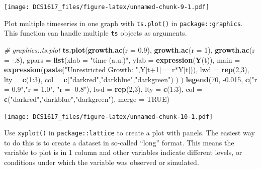 \documentclass[]{book}
\newenvironment{Shaded}{\begin{snugshade}}{\end{snugshade}}
\newcommand{\KeywordTok}[1]{\textcolor[rgb]{0.13,0.29,0.53}{\textbf{{#1}}}}
\newcommand{\DataTypeTok}[1]{\textcolor[rgb]{0.13,0.29,0.53}{{#1}}}
\newcommand{\DecValTok}[1]{\textcolor[rgb]{0.00,0.00,0.81}{{#1}}}
\newcommand{\FloatTok}[1]{\textcolor[rgb]{0.00,0.00,0.81}{{#1}}}
\newcommand{\StringTok}[1]{\textcolor[rgb]{0.31,0.60,0.02}{{#1}}}
\newcommand{\CommentTok}[1]{\textcolor[rgb]{0.56,0.35,0.01}{\textit{{#1}}}}
\newcommand{\OtherTok}[1]{\textcolor[rgb]{0.56,0.35,0.01}{{#1}}}
\newcommand{\NormalTok}[1]{{#1}}
\begin{document}
\texttt{[image: DCS1617\_files/figure-latex/unnamed-chunk-9-1.pdf]}

Plot multiple timeseries in one graph with \texttt{ts.plot()} in
\texttt{package::graphics}. This function can handle multiple
\texttt{ts} objects as arguments.

\begin{Shaded}
\begin{Highlighting}[]
\CommentTok{# graphics::ts.plot}
\KeywordTok{ts.plot}\NormalTok{(}\KeywordTok{growth.ac}\NormalTok{(}\DataTypeTok{r =} \FloatTok{0.9}\NormalTok{), }
        \KeywordTok{growth.ac}\NormalTok{(}\DataTypeTok{r =} \DecValTok{1}\NormalTok{), }
        \KeywordTok{growth.ac}\NormalTok{(}\DataTypeTok{r =} \NormalTok{-.}\DecValTok{8}\NormalTok{), }
        \DataTypeTok{gpars =} \KeywordTok{list}\NormalTok{(}\DataTypeTok{xlab =} \StringTok{"time (a.u.)"}\NormalTok{,}
                     \DataTypeTok{ylab =} \KeywordTok{expression}\NormalTok{(}\KeywordTok{Y}\NormalTok{(t)),}
                     \DataTypeTok{main =} \KeywordTok{expression}\NormalTok{(}\KeywordTok{paste}\NormalTok{(}\StringTok{"Unrestricted Growth: "}\NormalTok{,Y[t}\DecValTok{+1}\NormalTok{]==r*Y[t])),}
                     \DataTypeTok{lwd =} \KeywordTok{rep}\NormalTok{(}\DecValTok{2}\NormalTok{,}\DecValTok{3}\NormalTok{),}
                     \DataTypeTok{lty =} \KeywordTok{c}\NormalTok{(}\DecValTok{1}\NormalTok{:}\DecValTok{3}\NormalTok{),}
                     \DataTypeTok{col =} \KeywordTok{c}\NormalTok{(}\StringTok{"darkred"}\NormalTok{,}\StringTok{"darkblue"}\NormalTok{,}\StringTok{"darkgreen"}\NormalTok{)}
                     \NormalTok{)}
        \NormalTok{)}
\KeywordTok{legend}\NormalTok{(}\DecValTok{70}\NormalTok{, -}\FloatTok{0.015}\NormalTok{, }\KeywordTok{c}\NormalTok{(}\StringTok{"r = 0.9"}\NormalTok{,}\StringTok{"r = 1.0"}\NormalTok{, }\StringTok{"r = -0.8"}\NormalTok{), }\DataTypeTok{lwd =} \KeywordTok{rep}\NormalTok{(}\DecValTok{2}\NormalTok{,}\DecValTok{3}\NormalTok{), }\DataTypeTok{lty =} \KeywordTok{c}\NormalTok{(}\DecValTok{1}\NormalTok{:}\DecValTok{3}\NormalTok{), }\DataTypeTok{col =} \KeywordTok{c}\NormalTok{(}\StringTok{"darkred"}\NormalTok{,}\StringTok{"darkblue"}\NormalTok{,}\StringTok{"darkgreen"}\NormalTok{), }\DataTypeTok{merge =} \OtherTok{TRUE}\NormalTok{)}
\end{Highlighting}
\end{Shaded}

\texttt{[image: DCS1617\_files/figure-latex/unnamed-chunk-10-1.pdf]}

Use \texttt{xyplot()} in \texttt{package::lattice} to create a plot with
panels. The easiest way to do this is to create a dataset in so-called
``long'' format. This means the variable to plot is in 1 column and
other variables indicate different levels, or conditions under which the
variable was observed or simulated.
\end{document}

